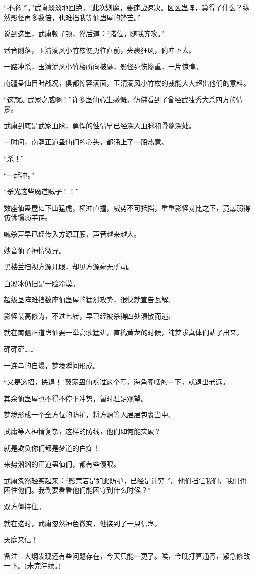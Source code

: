 \begin{this_body}
“不必了。”武庸淡淡地回绝，“此次剿魔，要速战速决。区区蛊阵，算得了什么？纵然影怪再多数倍，也难挡我等仙蛊屋的锋芒。”

说到这里，武庸顿了顿，然后道：“诸位，随我齐攻。”

话音刚落，玉清滴风小竹楼便勇往直前，夹裹狂风，俯冲下去。

一路冲杀，玉清滴风小竹楼所向披靡，影怪死伤惨重，一片惊惶。

南疆蛊仙目睹战况，俱都惊容满面，玉清滴风小竹楼的威能大大超出他们的意料。

“这就是武家之威啊！”许多蛊仙心生感慨，仿佛看到了曾经武独秀大杀四方的情景。

武庸到底是武家血脉，勇悍的性情早已经深入血脉和骨髓深处。

一时间，南疆正道蛊仙们的心头，都涌上了一股热意。

“杀！”

“一起冲。”

“杀光这些魔道贼子！！”

数座仙蛊屋如下山猛虎，横冲直撞，威势不可抵挡，重重影怪对比之下，竟孱弱得仿佛懦弱羊群。

喊杀声早已经传入方源耳膜，声音越来越大。

妙音仙子神情微异。

黑楼兰扫视方源几眼，却见方源毫无所动。

白凝冰仍旧是一脸冷漠。

超级蛊阵难挡数座仙蛊屋的猛烈攻势，很快就宣告瓦解。

影怪最高修为，不过七转，早已经被杀得四处溃散而逃。

就在南疆正道蛊仙要一举高歌猛进，直捣黄龙的时候，纯梦求真体们站了出来。

砰砰砰……

一连串的自爆，梦境瞬间形成。

“又是这招，快退！”翼家蛊仙吃过这个亏，海角阁嗖的一下，就退出老远。

其余仙蛊屋也不得不停下冲势，暂时驻足观望。

梦境形成一个全方位的防护，将方源等人层层包裹当中。

武庸等人神情复杂，这样的防线，他们如何能突破？

就是欺负你们都是梦道的白痴！

来势汹汹的正道蛊仙们，都有些傻眼。

武庸忽然轻笑起来：“影宗若是如此防护，已经是计穷了。他们挡住我们，我们也困住他们。我倒要看看他们能困守到什么时候？”

双方僵持住。

就在这时，武庸忽然神色微变，他接到了一只信蛊。

天庭来信！

备注：大纲发现还有些问题存在，今天只能一更了。唉，今晚打算通宵，紧急修改一下。(未完待续。)

\end{this_body}

